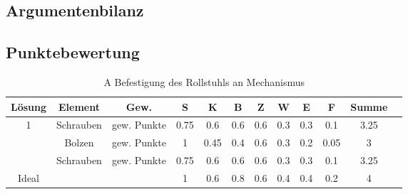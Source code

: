 \documentclass[10pt,a4paper]{article}
\begin{document}
\subsection{Argumentenbilanz}
\subsection{Punktebewertung}
\begin{table}[h]
    \centering
    \begin{tabular}{cccccccccccc}
        \toprule
        \textbf{Lösung} & \textbf{Element} & \textbf{Gew.} & \textbf{S} & \textbf{K} & \textbf{B} & \textbf{Z} & \textbf{W} & \textbf{E} & \textbf{F} & \textbf{Summe} & \\
        \midrule
        1               & Schrauben        & gew. Punkte   & 0.75       & 0.6        & 0.6        & 0.6        & 0.3        & 0.3        & 0.1        & 3.25             \\
        \addlinespace
        2               & Bolzen           & gew. Punkte   & 1          & 0.45       & 0.4        & 0.6        & 0.3        & 0.2        & 0.05       & 3                \\
        \addlinespace
        3               & Schrauben        & gew. Punkte   & 0.75       & 0.6        & 0.6        & 0.6        & 0.3        & 0.3        & 0.1        & 3.25             \\
        \midrule
        Ideal           &                  &               & 1          & 0.6        & 0.8        & 0.6        & 0.4        & 0.4        & 0.2        & 4                \\
        \bottomrule
    \end{tabular}
    \caption{A Befestigung des Rollstuhls an Mechanismus}
    \label{tab:befestigung}
\end{table}
\end{document}
